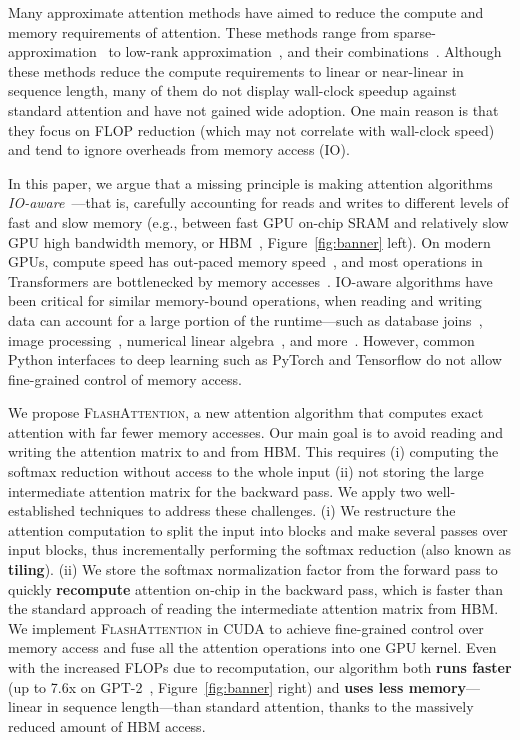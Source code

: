 Many approximate attention methods have aimed to reduce the compute and memory requirements of attention. These methods range from sparse-approximation~\citep{kitaev2020reformer, roy2021efficient} to low-rank approximation~\citep{wang2020linformer, katharopoulos2020transformers, choromanski2020rethinking}, and their combinations~\citep{beltagy2020longformer, zaheer2020bigbird, scatterbrain}. Although these methods reduce the compute requirements to linear or near-linear in sequence length, many of them do not display wall-clock speedup against standard attention and have not gained wide adoption. One main reason is that they focus on FLOP reduction (which may not correlate with wall-clock speed) and tend to ignore overheads from memory access (IO).

In this paper, we argue that a missing principle is making attention algorithms \textit{IO-aware}~\citep{aggarwal1988input}---that is, carefully accounting for reads and writes to different levels of fast and slow memory (e.g., between fast GPU on-chip SRAM and relatively slow GPU high bandwidth memory, or HBM~\citep{jia2018dissecting}, Figure~\ref{fig:banner} left). On modern GPUs, compute speed has out-paced memory speed~\citep{nvidia2017nvidia,nvidia2020nvidia,nvidia2022nvidia}, and most operations in Transformers are bottlenecked by memory accesses~\citep{ivanov2021data}. IO-aware algorithms have been critical for similar memory-bound operations, when reading and writing data can account for a large portion of the runtime---such as database joins~\citep{ramakrishnan2003database}, image processing~\citep{ragan2013halide}, numerical linear algebra~\citep{blackford2002updated}, and more~\citep{williams2009roofline, hennessy2003memory}. However, common Python interfaces to deep learning such as PyTorch and Tensorflow do not allow fine-grained control of memory access.

We propose \textsc{FlashAttention}, a new attention algorithm that computes exact attention with far fewer memory accesses. Our main goal is to avoid reading and writing the attention matrix to and from HBM. This requires (i) computing the softmax reduction without access to the whole input (ii) not storing the large intermediate attention matrix for the backward pass. We apply two well-established techniques to address these challenges. (i) We restructure the attention computation to split the input into blocks and make several passes over input blocks, thus incrementally performing the softmax reduction (also known as \textbf{tiling}). (ii) We store the softmax normalization factor from the forward pass to quickly \textbf{recompute} attention on-chip in the backward pass, which is faster than the standard approach of reading the intermediate attention matrix from HBM. We implement \textsc{FlashAttention} in CUDA to achieve fine-grained control over memory access and fuse all the attention operations into one GPU kernel. Even with the increased FLOPs due to recomputation, our algorithm both \textbf{runs faster} (up to 7.6x on GPT-2~\citep{radford2019language}, Figure~\ref{fig:banner} right) and \textbf{uses less memory}---linear in sequence length---than standard attention, thanks to the massively reduced amount of HBM access.

